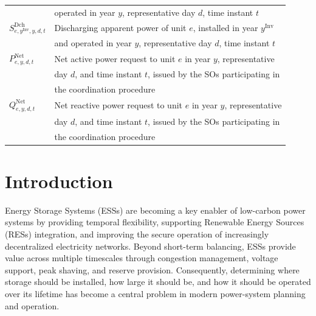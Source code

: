 \documentclass[preprint,12pt]{elsarticle}
\begin{document}
\begin{table}[htbp!]
\begin{tabular}{l l}
        ~                                    & operated in year $y$, representative day $d$, time instant $t$\\
        $S^\text{Dch}_{e,y^\text{Inv},y,d,t}$ & Discharging apparent power of unit $e$, installed in year $y^\text{Inv}$\\
        ~                                     & and operated in year $y$, representative day $d$, time instant $t$\\
        $P^{\text{Net}}_{e,y,d,t}$ & Net active power request to unit $e$ in year $y$, representative \\
        ~                          & day $d$, and time instant $t$, issued by the SOs participating in\\
        ~                          & the coordination procedure\\
        $Q^{\text{Net}}_{e,y,d,t}$ & Net reactive power request to unit $e$ in year $y$, representative \\
        ~                          & day $d$, and time instant $t$, issued by the SOs participating in\\
        ~                          & the coordination procedure\\
        \bottomrule
    \end{tabular}
\end{table}

\newpage

\section{Introduction}

Energy Storage Systems (ESSs) are becoming a key enabler of low-carbon power systems by providing temporal flexibility, supporting Renewable Energy Sources (RESs) integration, and improving the secure operation of increasingly decentralized electricity networks. Beyond short-term balancing, ESSs provide value across multiple timescales through congestion management, voltage support, peak shaving, and reserve provision. Consequently, determining where storage should be installed, how large it should be, and how it should be operated over its lifetime has become a central problem in modern power-system planning and operation.
\end{document}
